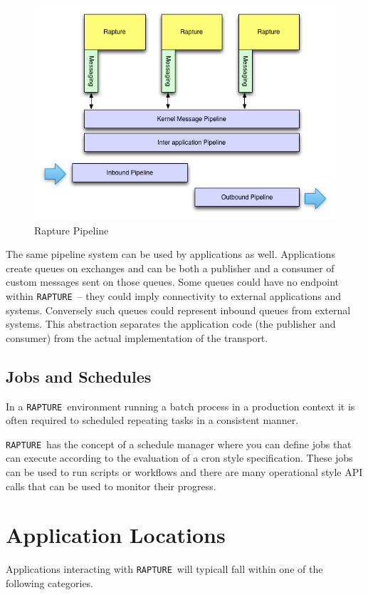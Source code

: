 \documentclass[12pt,twoside,a4paper]{book}
\newcommand{\Rapture}{\Verb+RAPTURE+~}
\begin{document}
\begin{figure}[H]
\centering
\includegraphics[scale=0.75]{Graphics/PipelineExplain}
\caption{Rapture Pipeline}
\label{fig:PipelineExample}
\end{figure}

The same pipeline system can be used by applications as well. Applications create queues on exchanges and can be both a publisher and a consumer of custom messages
sent on those queues. Some queues could have no endpoint within \Rapture -- they could imply connectivity to external applications and systems. Conversely such queues could
represent inbound queues from external systems. This abstraction separates the application code (the publisher and consumer) from the actual implementation of the transport.


\section{Jobs and Schedules}

In a \Rapture environment running a batch process in a production context it is often required to scheduled repeating tasks in a consistent manner.

\Rapture has the concept of a schedule manager where you can define jobs that can execute according to the evaluation of a cron style specification. These jobs
can be used to run scripts or workflows and there are many operational style API calls that can be used to monitor their progress.


\chapter{Application Locations}
Applications interacting with \Rapture will typicall fall within one of the
following categories.
\end{document}
